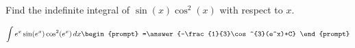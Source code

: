 \documentclass{ximera}
\author{Gregory Hartman \and Matthew Carr}
\begin{document}
\begin{exercise}

Find the indefinite integral of $\sin(x)\cos^2(x)$ with respect to $x$.

\[
\int e^x\sin(e^x)\cos^2(e^x)\d x
\begin{prompt}
=\answer{-\frac{1}{3}\cos^{3}(e^x)+C}
\end{prompt}
\]


\end{exercise}
\end{document}
